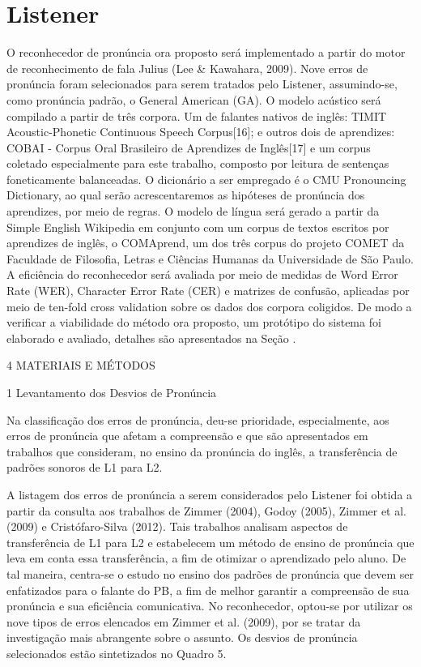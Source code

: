 
\chapter{Listener}\label{ch:listener}

O reconhecedor de pron\'uncia ora proposto ser\'a implementado a partir do
motor de reconhecimento de fala Julius (Lee \& Kawahara, 2009). Nove
erros de pron\'uncia foram selecionados para serem tratados pelo Listener,
assumindo-se, como pron\'uncia padr\~ao, o General American (GA). O modelo
ac\'ustico ser\'a compilado a partir de tr\^es corpora. Um de falantes nativos
de ingl\^es: TIMIT Acoustic-Phonetic Continuous Speech Corpus{[}16{]}; e
outros dois de aprendizes: COBAI - Corpus Oral Brasileiro de Aprendizes
de Ingl\^es{[}17{]} e um corpus coletado especialmente para este trabalho,
composto por leitura de senten\c{c}as foneticamente balanceadas. O
dicion\'ario a ser empregado \'e o CMU Pronouncing Dictionary, ao qual ser\~ao
acrescentaremos as hip\'oteses de pron\'uncia dos aprendizes, por meio de
regras. O modelo de l\'ingua ser\'a gerado a partir da Simple English
Wikipedia em conjunto com um corpus de textos escritos por aprendizes de
ingl\^es, o COMAprend, um dos tr\^es corpus do projeto COMET da Faculdade de
Filosofia, Letras e Ci\^encias Humanas da Universidade de S\~ao Paulo. A
efici\^encia do reconhecedor ser\'a avaliada por meio de medidas de Word
Error Rate (WER), Character Error Rate (CER) e matrizes de confus\~ao,
aplicadas por meio de ten-fold cross validation sobre os dados dos
corpora coligidos. De modo a verificar a viabilidade do m\'etodo ora
proposto, um prot\'otipo do sistema foi elaborado e avaliado, detalhes s\~ao
apresentados na Se\c{c}\~ao .

4 MATERIAIS E M\'ETODOS

1 Levantamento dos Desvios de Pron\'uncia

Na classifica\c{c}\~ao dos erros de pron\'uncia, deu-se prioridade,
especialmente, aos erros de pron\'uncia que afetam a compreens\~ao e que s\~ao
apresentados em trabalhos que consideram, no ensino da pron\'uncia do
ingl\^es, a transfer\^encia de padr\~oes sonoros de L1 para L2.

A listagem dos erros de pron\'uncia a serem considerados pelo Listener foi
obtida a partir da consulta aos trabalhos de Zimmer (2004), Godoy
(2005), Zimmer et al. (2009) e Crist\'ofaro-Silva (2012). Tais trabalhos
analisam aspectos de transfer\^encia de L1 para L2 e estabelecem um m\'etodo
de ensino de pron\'uncia que leva em conta essa transfer\^encia, a fim de
otimizar o aprendizado pelo aluno. De tal maneira, centra-se o estudo no
ensino dos padr\~oes de pron\'uncia que devem ser enfatizados para o falante
do PB, a fim de melhor garantir a compreens\~ao de sua pron\'uncia e sua
efici\^encia comunicativa. No reconhecedor, optou-se por utilizar os nove
tipos de erros elencados em Zimmer et al. (2009), por se tratar da
investiga\c{c}\~ao mais abrangente sobre o assunto. Os desvios de pron\'uncia
selecionados est\~ao sintetizados no Quadro 5.

